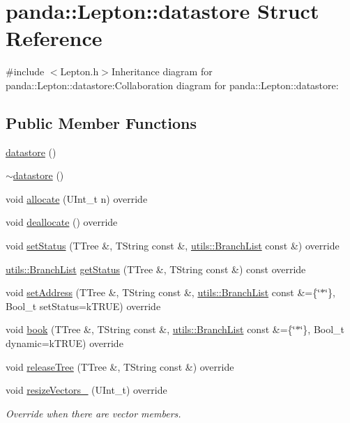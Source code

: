 \hypertarget{structpanda_1_1Lepton_1_1datastore}{
\section{panda::Lepton::datastore Struct Reference}
\label{structpanda_1_1Lepton_1_1datastore}
}


{\ttfamily \#include $<$Lepton.h$>$}Inheritance diagram for panda::Lepton::datastore:Collaboration diagram for panda::Lepton::datastore:\subsection*{Public Member Functions}
\begin{DoxyCompactItemize}
\item 
\hyperlink{structpanda_1_1Lepton_1_1datastore_adf84bb1f833eb50c3c73d81af211496e}{datastore} ()
\item 
\hyperlink{structpanda_1_1Lepton_1_1datastore_aded63fdccd7551ae16f99adbd29afb82}{$\sim$datastore} ()
\item 
void \hyperlink{structpanda_1_1Lepton_1_1datastore_a109ac02caed6e0a69a1b00248d80500e}{allocate} (UInt\_\-t n) override
\item 
void \hyperlink{structpanda_1_1Lepton_1_1datastore_a527515ee96020a4aaef41d9de157c131}{deallocate} () override
\item 
void \hyperlink{structpanda_1_1Lepton_1_1datastore_a0a158cefd0f32a98625eb5736c414b01}{setStatus} (TTree \&, TString const \&, \hyperlink{classpanda_1_1utils_1_1BranchList}{utils::BranchList} const \&) override
\item 
\hyperlink{classpanda_1_1utils_1_1BranchList}{utils::BranchList} \hyperlink{structpanda_1_1Lepton_1_1datastore_a44602d14a45e9a23ffdb02f9dfa7e018}{getStatus} (TTree \&, TString const \&) const override
\item 
void \hyperlink{structpanda_1_1Lepton_1_1datastore_a01bc67f154130787caab05786b3169c6}{setAddress} (TTree \&, TString const \&, \hyperlink{classpanda_1_1utils_1_1BranchList}{utils::BranchList} const \&=\{\char`\"{}$\ast$\char`\"{}\}, Bool\_\-t setStatus=kTRUE) override
\item 
void \hyperlink{structpanda_1_1Lepton_1_1datastore_ab6cf5ada9f43228301c6bd97b9b6238a}{book} (TTree \&, TString const \&, \hyperlink{classpanda_1_1utils_1_1BranchList}{utils::BranchList} const \&=\{\char`\"{}$\ast$\char`\"{}\}, Bool\_\-t dynamic=kTRUE) override
\item 
void \hyperlink{structpanda_1_1Lepton_1_1datastore_a3288e551dbce7062e6f2e4e88f1a6a40}{releaseTree} (TTree \&, TString const \&) override
\item 
void \hyperlink{structpanda_1_1Lepton_1_1datastore_ae0167ad568d7b57d6e11b1775cd790c7}{resizeVectors\_\-} (UInt\_\-t) override
\begin{DoxyCompactList}\small\item\em Override when there are vector members. \item\end{DoxyCompactList}\end{DoxyCompactItemize}


